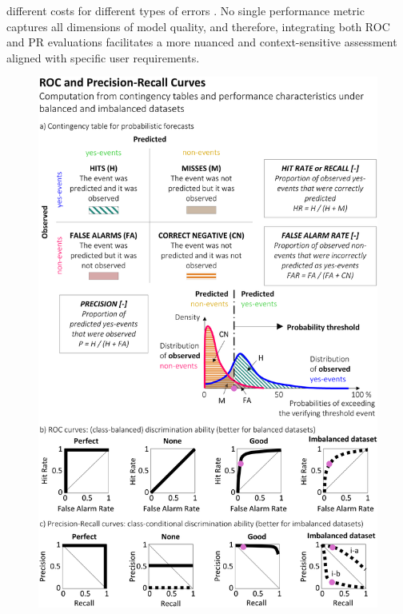 different costs for different types of errors \citep{Sofaer_2019}. No single performance metric captures all dimensions of model quality, and therefore, integrating both ROC and PR evaluations facilitates a more nuanced and context-sensitive assessment aligned with specific user requirements.

\begin{figure}[htbp]
\centering
\includegraphics[scale=0.9]{curve_roc_pr_examples.png}

\end{figure}
